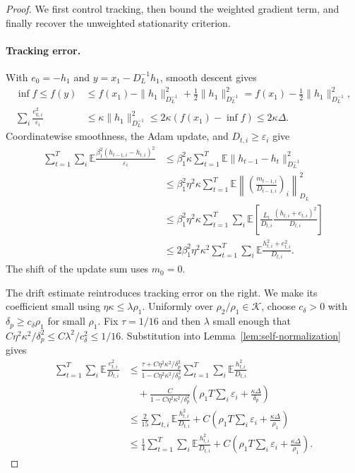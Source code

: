 \documentclass[11pt,letterpaper]{article}
\theoremstyle{definition}
\newcommand{\E}{\mathbb E}
\newcommand{\eps}{\varepsilon}
\begin{document}
\begin{proof}
We first control tracking, then bound the weighted gradient term, and
finally recover the unweighted stationarity criterion.

\paragraph{Tracking error.}
With $e_0=-h_1$ and $y=x_1-D_L^{-1}h_1$, smooth descent gives
\begin{align*}
\inf f\le f(y)
&\le f(x_1)-\|h_1\|_{D_L^{-1}}^2
+\frac12\|h_1\|_{D_L^{-1}}^2
=f(x_1)-\frac12\|h_1\|_{D_L^{-1}}^2,\\
\sum_i\frac{e_{0,i}^2}{\eps_i}
&\le\kappa\|h_1\|_{D_L^{-1}}^2
\le2\kappa(f(x_1)-\inf f)\le2\kappa\Delta.
\end{align*}
Coordinatewise smoothness, the Adam update, and $D_{t,i}\ge\eps_i$ give
\begin{align*}
\sum_{t=1}^T\sum_i
\E\frac{\beta_1^2(h_{t-1,i}-h_{t,i})^2}{\eps_i}
&\le
\beta_1^2\kappa\sum_{t=1}^T
\E\|h_{t-1}-h_t\|_{D_L^{-1}}^2\\
&\le
\beta_1^2\eta^2\kappa\sum_{t=1}^T
\E\left\|\left(\frac{m_{t-1,i}}{D_{t-1,i}}\right)_i\right\|_{D_L}^2\\
&\le\beta_1^2\eta^2\kappa\sum_{t=1}^T\sum_i
\E\left[\frac{L_i}{D_{t,i}}
\frac{(h_{t,i}+e_{t,i})^2}{D_{t,i}}\right]\\
&\le
2\beta_1^2\eta^2\kappa^2
\sum_{t=1}^T\sum_i
\E\frac{h_{t,i}^2+e_{t,i}^2}{D_{t,i}}.
\end{align*}
The shift of the update sum uses $m_0=0$.

The drift estimate reintroduces tracking error on the right. We make
its coefficient small using $\eta\kappa\le\lambda\rho_1$.
Uniformly over $\rho_2/\rho_1\in\mathcal K$, choose
$c_\delta>0$ with $\delta_p\ge c_\delta\rho_1$ for small $\rho_1$.
Fix $\tau=1/16$ and then $\lambda$ small enough that
$C\eta^2\kappa^2/\delta_p^2\le C\lambda^2/c_\delta^2\le1/16$.
Substitution into Lemma~\ref{lem:self-normalization} gives
\begin{align}
\sum_{t=1}^T\sum_i\E\frac{e_{t,i}^2}{D_{t,i}}
&\le\frac{\tau+C\eta^2\kappa^2/\delta_p^2}
{1-C\eta^2\kappa^2/\delta_p^2}
\sum_{t=1}^T\sum_i\E\frac{h_{t,i}^2}{D_{t,i}}\nonumber\\
&\quad+\frac{C}{1-C\eta^2\kappa^2/\delta_p^2}
\left(\rho_1T\sum_i\eps_i+\frac{\kappa\Delta}{\delta_p}\right)\nonumber\\
&\le\frac2{15}\sum_{t,i}\E\frac{h_{t,i}^2}{D_{t,i}}
+C\left(\rho_1T\sum_i\eps_i+\frac{\kappa\Delta}{\rho_1}\right)\nonumber\\
&\le\frac14\sum_{t=1}^T\sum_i\E\frac{h_{t,i}^2}{D_{t,i}}
+C\left(
\rho_1T\sum_i\eps_i+\frac{\kappa\Delta}{\rho_1}
\right).
\label{eq:tracking-aggregate}
\end{align}


\end{proof}
\end{document}
